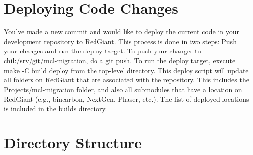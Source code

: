 \documentclass[12pt]{article} %
\begin{document}
\section{Deploying Code Changes}

You've made a new commit and would like to deploy the current code in your development repository to RedGiant.
This process is done in two steps: Push your changes and run the deploy target.
To push your changes to chil:/srv/git/mcl-migration, do a git push.
To run the deploy target, execute make -C build deploy from the top-level directory.
This deploy script will update all folders on RedGiant that are associated with the repository.
This includes the Projects/mcl-migration folder, and also all submodules that have a location on RedGiant (e.g., bincarbon, NextGen, Phaser, etc.).
The list of deployed locations is included in the builds directory.

\section{Directory Structure} %
\end{document}
